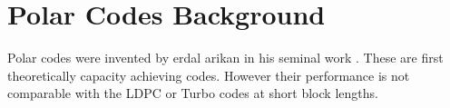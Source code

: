 \chapter{Polar Codes Background} \label{chap:BackgroundPolarCode5G}


Polar codes were invented by erdal arikan in his seminal work \cite{Arikan}. These are first theoretically capacity achieving codes. However their performance is not comparable with the LDPC or Turbo codes at short block lengths.


